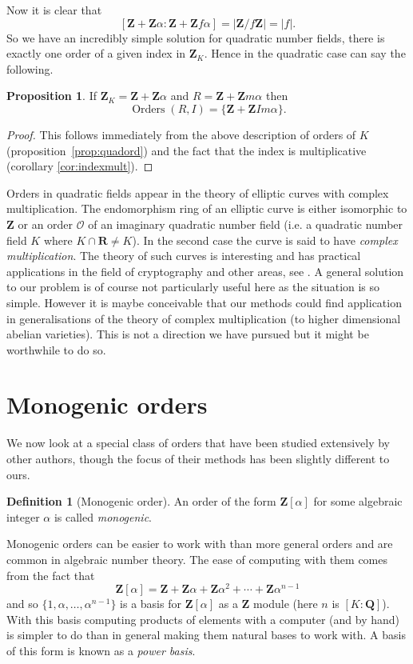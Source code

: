 \documentclass[12pt,a4paper,abstracton,bibtotoc]{scrreprt}
\theoremstyle{definition}
\newtheorem{prop}{Proposition}
\newtheorem{defn}{Definition}
\newcommand{\QQ}{\mathbf{Q}}
\newcommand{\RR}{\mathbf{R}}
\newcommand{\ZZ}{\mathbf{Z}}
\renewcommand{\O}{\mathcal{O}}
\DeclareMathOperator{\Orders}{Orders}
\begin{document}
Now it is clear that
\[
[\ZZ + \ZZ\alpha : \ZZ + \ZZ f \alpha] = |\ZZ/f\ZZ| = |f|.
\]
So we have an incredibly simple solution for quadratic number fields, there is exactly one order of a given index in $\ZZ_K$.
Hence in the quadratic case can say the following.

\begin{prop}
If $\ZZ_K = \ZZ + \ZZ\alpha$ and $R = \ZZ + \ZZ m\alpha$ then
\[
\Orders(R, I) = \{\ZZ + \ZZ Im\alpha\}.
\]
\end{prop}
\begin{proof}
This follows immediately from the above description of orders of $K$ (proposition~\ref{prop:quadord}) and the fact that the index is multiplicative (corollary \ref{cor:indexmult}).
\end{proof}

Orders in quadratic fields appear in the theory of elliptic curves with complex multiplication.
The endomorphism ring of an elliptic curve is either isomorphic to $\ZZ$ or an order $\O$ of an imaginary quadratic number field (i.e. a quadratic number field $K$ where $K\cap \RR \ne K$).
In the second case the curve is said to have \emph{complex multiplication}.
The theory of such curves is interesting and has practical applications in the field of cryptography and other areas, see \cite{schertz}.
A general solution to our problem is of course not particularly useful here as the situation is so simple.
However it is maybe conceivable that our methods could find application in generalisations of the theory of complex multiplication (to higher dimensional abelian varieties).
This is not a direction we have pursued but it might be worthwhile to do so.


\section{Monogenic orders}

We now look at a special class of orders that have been studied extensively by other authors, though the focus of their methods has been slightly different to ours.

\begin{defn}[Monogenic order]
An order of the form $\ZZ[\alpha]$ for some algebraic integer $\alpha$ is called \emph{monogenic}.
\end{defn}

Monogenic orders can be easier to work with than more general orders and are common in algebraic number theory.
The ease of computing with them comes from the fact that
\[
\ZZ[\alpha] = \ZZ + \ZZ\alpha + \ZZ\alpha^2 + \cdots + \ZZ\alpha^{n-1}
\]
and so $\{1,\alpha,\ldots,\alpha^{n-1}\}$ is a basis for $\ZZ[\alpha]$ as a $\ZZ$ module (here $n$ is $[K : \QQ]$).
With this basis computing products of elements with a computer (and by hand) is simpler to do than in general making them natural bases to work with.
A basis of this form is known as a \emph{power basis}.
\end{document}
